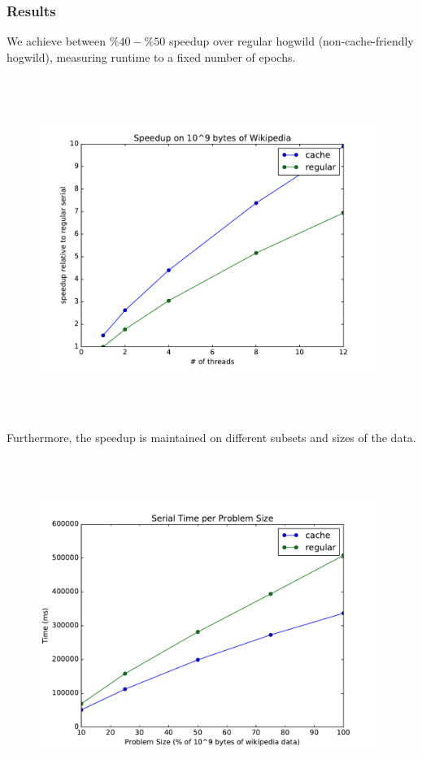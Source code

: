 \documentclass[times,11pt]{article}
\numberwithin{equation}{section}		%
\numberwithin{figure}{section}			%
\numberwithin{table}{section}				%
\begin{document}
\subsubsection{Results}
\noindent We achieve between $\%40-\%50$ speedup over regular hogwild (non-cache-friendly hogwild),
measuring runtime to a fixed number of epochs.
\begin{figure}[H]
\includegraphics[width=11cm,height=11cm,keepaspectratio]{w2v_speedup_plot.pdf}
\end{figure}
\noindent Furthermore, the speedup is maintained on different subsets and sizes of the data.
\begin{figure}[H]
\begin{center}
\includegraphics[width=11cm,height=11cm,keepaspectratio]{w2v_problem_size_time_plot.pdf}
\end{center}
\end{figure}
\end{document}
